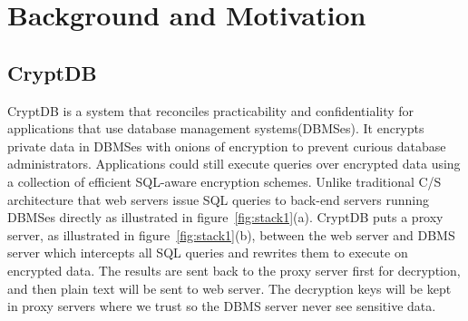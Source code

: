 \section{Background and Motivation}

\subsection{CryptDB}
CryptDB is a system that reconciles practicability and confidentiality for applications that use database management systems(DBMSes). 
It encrypts private data in DBMSes with onions of encryption to prevent curious database administrators. 
Applications could still execute queries over encrypted data using a collection of efficient SQL-aware encryption schemes. 
Unlike traditional C/S architecture that web servers issue SQL queries to back-end servers running DBMSes directly as illustrated in figure~\ref{fig:stack1}(a). 
CryptDB puts a proxy server, as illustrated in figure~\ref{fig:stack1}(b), between the web server and DBMS server which intercepts all SQL queries and rewrites them to execute on encrypted data. 
The results are sent back to the proxy server first for decryption, and then plain text will be sent to web server. 
The decryption keys will be kept in proxy servers where we trust so the DBMS server never see sensitive data.





